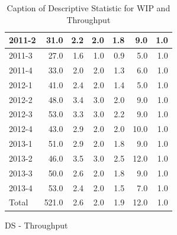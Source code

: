 \documentclass[UKenglish]{ifimaster}  %
\begin{document}
\begin{appendices}
\begin{table}[!htbp]
\begin{adjustwidth}{-3cm}{}
\begin{subfigure}[b]{0.3\textwidth}
{\begin{tabular}{ | l | r | r | r | r | r | r | }
2011-2 & 31.0 & 2.2 & 2.0 & 1.8 & 9.0 & 1.0\\ \hline
2011-3 & 27.0 & 1.6 & 1.0 & 0.9 & 5.0 & 1.0\\ \hline
2011-4 & 33.0 & 2.0 & 2.0 & 1.3 & 6.0 & 1.0\\ \hline
2012-1 & 41.0 & 2.4 & 2.0 & 1.4 & 5.0 & 1.0\\ \hline
2012-2 & 48.0 & 3.4 & 3.0 & 2.0 & 9.0 & 1.0\\ \hline
2012-3 & 53.0 & 3.3 & 3.0 & 2.2 & 9.0 & 1.0\\ \hline
2012-4 & 43.0 & 2.9 & 2.0 & 2.0 & 10.0 & 1.0\\ \hline
2013-1 & 51.0 & 2.9 & 2.0 & 1.8 & 9.0 & 1.0\\ \hline
2013-2 & 46.0 & 3.5 & 3.0 & 2.5 & 12.0 & 1.0\\ \hline
2013-3 & 50.0 & 2.6 & 2.0 & 1.8 & 9.0 & 1.0\\ \hline
2013-4 & 53.0 & 2.4 & 2.0 & 1.5 & 7.0 & 1.0\\ \hline
Total & 521.0 & 2.6 & 2.0 & 1.9 & 12.0 & 1.0\\ \hline
\end{tabular}
}
\caption{DS - Throughput}
 \label{DS:Throughput:9}
\end{subfigure}
\end{adjustwidth}
\caption[Optional caption for list of figures]{Caption of Descriptive Statistic for WIP and Throughput}
\label{DS:9:1}
\end{table}


\end{appendices}
\end{document}
